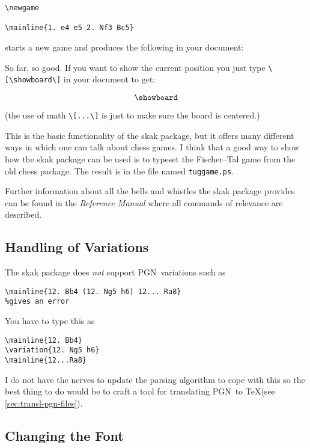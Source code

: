 \documentclass[11pt,twocolumn]{article}
\newcommand{\package}[1]{\textsf{#1}}
\newcommand{\pgn}{PGN\ }
\newcommand{\filename}[1]{\texttt{#1}}
\begin{document}
\begin{verbatim}
\newgame

\mainline{1. e4 e5 2. Nf3 Bc5}
\end{verbatim}
 
\newgame
\noindent
starts a new game and produces the following in your document: 


So far, so good. If you want to show the current position you just
type \verb|\[\showboard\]| in your document to get:

\[\showboard\]

\noindent
(the use of math \verb|\[...\]| is just to make sure the board is centered.)

This is the basic functionality of the \package{skak} package, but it
offers many different ways in which one can talk about chess
games. I think that a good way to show how the \package{skak} package
can be used is to typeset the Fischer--Tal game from the old
\package{chess} package. The result is in the file named
\filename{tuggame.ps}.

Further information about all the bells and whistles the
\package{skak} package provides can be found in the \emph{Reference
  Manual} where all commands of relevance are described.


\subsection{Handling of Variations}
\label{sec:handling-variations}


The \package{skak} package does \emph{not} support
\pgn variations such as
\begin{verbatim}
\mainline{12. Bb4 (12. Ng5 h6) 12... Ra8}
%gives an error
\end{verbatim}

You have to type this as
\begin{verbatim}
\mainline{12. Bb4}
\variation{12. Ng5 h6}
\mainline{12...Ra8}
\end{verbatim}

I do not have the nerves to update the parsing algorithm to cope with
this so the best thing to do would be to craft a tool for translating
\pgn to \TeX (see \ref{sec:transl-pgn-files}).


\subsection{Changing the Font}
\label{sec:changing-font}
\end{document}
